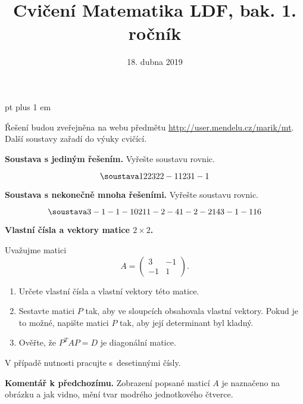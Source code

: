 \documentclass{article}
\let\oldtextbf\textbf
\def\textbf#1{%
  \oldtextbf{\color{red} #1}}
\begin{document}
 pt plus 1 em
\title{Cvičení Matematika LDF, bak. 1. ročník}
\date{18. dubna 2019}

\maketitle

Řešení budou zveřejněna na webu předmětu \url{http://user.mendelu.cz/marik/mt}.
Další soustavy zařadí do výuky cvičící.

\newpage


\textbf{Soustava s jediným řešením.} Vyřešte soustavu rovnic.

\shorthandoff{-}
\begin{equation*}
\soustava
1 2 2 3
2 2 -1 1
2 3 1 -1

\end{equation*}

\newpage
\textbf{Soustava s nekonečně mnoha řešeními.} Vyřešte soustavu rovnic.

\begin{equation*}
\soustava
3 -1 -1 -1 0
2 1 1 -2 -4
1 -2 -2 1 4
3 -1 -1 1 6

\end{equation*}

\newpage
\textbf{Vlastní čísla a vektory matice $2\times 2$.}

Uvažujme matici
\begin{equation*} A=
  \begin{pmatrix}
  3 & -1\\
  -1 & 1
\end{pmatrix}.
\end{equation*}
\begin{enumerate}
\item Určete vlastní čísla a vlastní vektory této matice.
\item Sestavte matici $P$ tak, aby ve sloupcích obsahovala vlastní vektory.
Pokud je to možné, napište matici $P$ tak, aby její determinant byl kladný.
\item Ověřte, že  $P^TAP=D$  je diagonální matice.
\end{enumerate}

V případě nutnosti pracujte s~desetinnými čísly.

\newpage \textbf{Komentář k předchozímu.} Zobrazení popsané maticí $A$
je naznačeno na obrázku a jak vidno, mění tvar modrého jednotkového čtverce.
\end{document}
